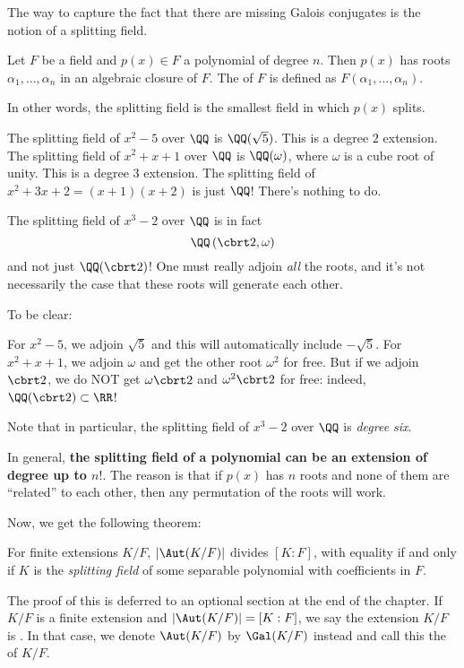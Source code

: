 The way to capture the fact that there are missing Galois conjugates is the notion of a splitting field.
\begin{definition}
	Let $F$ be a field and $p(x) \in F$ a polynomial of degree $n$.
	Then $p(x)$ has roots $\alpha_1, \dots, \alpha_n$ in an algebraic closure of $F$.
	The  of $F$ is defined as $F(\alpha_1, \dots, \alpha_n)$.
\end{definition}
In other words, the splitting field is the smallest field in which $p(x)$ splits.
\begin{example}
	\listhack
	\begin{enumerate}[(a)]
		\ii The splitting field of $x^2 - 5$ over $\QQ$ is $\QQ(\sqrt 5)$.
		This is a degree $2$ extension.
		\ii The splitting field of $x^2+x+1$ over $\QQ$ is $\QQ(\omega)$,
		where $\omega$ is a cube root of unity.
		This is a degree $3$ extension.
		\ii The splitting field of $x^2+3x+2 = (x+1)(x+2)$ is just $\QQ$!
		There's nothing to do.
	\end{enumerate}
\end{example}
\begin{example}
	The splitting field of $x^3 - 2$ over $\QQ$ is in fact
	\[ \QQ\left( \cbrt 2, \omega \right) \]
	and not just $\QQ(\cbrt 2)$!
	One must really adjoin \emph{all} the roots, and it's not necessarily the case that
	these roots will generate each other.

	To be clear:
	\begin{itemize}
	\ii For $x^2-5$, we adjoin $\sqrt 5$ and this will automatically include $-\sqrt 5$.
	\ii For $x^2+x+1$, we adjoin $\omega$ and get the other root $\omega^2$ for free.
	\ii But if we adjoin $\cbrt 2$, we do NOT get $\omega\cbrt2$ and $\omega^2\cbrt2$ for free:
	indeed, $\QQ(\cbrt 2) \subset \RR$!
	\end{itemize}
	Note that in particular, the splitting field of $x^3-2$ over $\QQ$ is \emph{degree six}.
\end{example}

In general,
\textbf{the splitting field of a polynomial can be an extension of degree up to $n!$}.
The reason is that if $p(x)$ has $n$ roots and none of them are ``related'' to each other,
then any permutation of the roots will work.

Now, we get the following theorem:
\begin{theorem}
	For finite extensions $K/F$, 
	$\left\lvert \Aut(K/F) \right\rvert$ divides $[K:F]$,
	with equality if and only if $K$ is the \emph{splitting field}
	of some separable polynomial with coefficients in $F$.
	\label{thm:Galois_splitting}
\end{theorem}
The proof of this is deferred to an optional section at the end of the chapter.
If $K/F$ is a finite extension and $\left\lvert \Aut(K/F) \right\rvert = [K:F]$,
we say the extension $K/F$ is .
In that case, we denote $\Aut(K/F)$ by $\Gal(K/F)$ instead
and call this the  of $K/F$.

